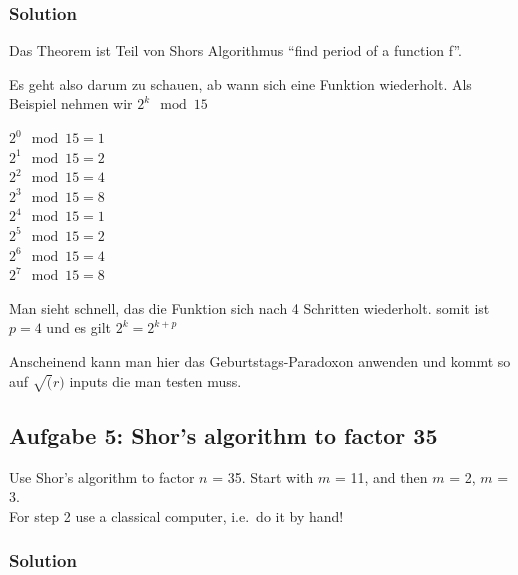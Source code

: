 \documentclass[11pt]{article}
\begin{document}
\hypertarget{solution}{%
\subsubsection{Solution}\label{solution}}

Das Theorem ist Teil von Shors Algorithmus ``find period of a function
f''.

Es geht also darum zu schauen, ab wann sich eine Funktion wiederholt.
Als Beispiel nehmen wir \(2^{k} \mod 15\)

\(2^{0} \mod 15 = 1\)\\
\(2^{1} \mod 15 = 2\)\\
\(2^{2} \mod 15 = 4\)\\
\(2^{3} \mod 15 = 8\)\\
\(2^{4} \mod 15 = 1\)\\
\(2^{5} \mod 15 = 2\)\\
\(2^{6} \mod 15 = 4\)\\
\(2^{7} \mod 15 = 8\)

Man sieht schnell, das die Funktion sich nach 4 Schritten wiederholt.
somit ist \(p=4\) und es gilt \(2^{k} = 2^{k+p}\)

Anscheinend kann man hier das Geburtstags-Paradoxon anwenden und kommt
so auf \(\sqrt(r)\) inputs die man testen muss.

    \hypertarget{aufgabe-5-shors-algorithm-to-factor-35}{%
\subsection{Aufgabe 5: Shor's algorithm to factor
35}\label{aufgabe-5-shors-algorithm-to-factor-35}}

Use Shor's algorithm to factor \(n\) = 35. Start with \(m\) = 11, and
then \(m\) = 2, \(m\) = 3.\\
For step 2 use a classical computer, i.e.~do it by hand!

\hypertarget{solution}{%
\subsubsection{Solution}\label{solution}}
\end{document}

